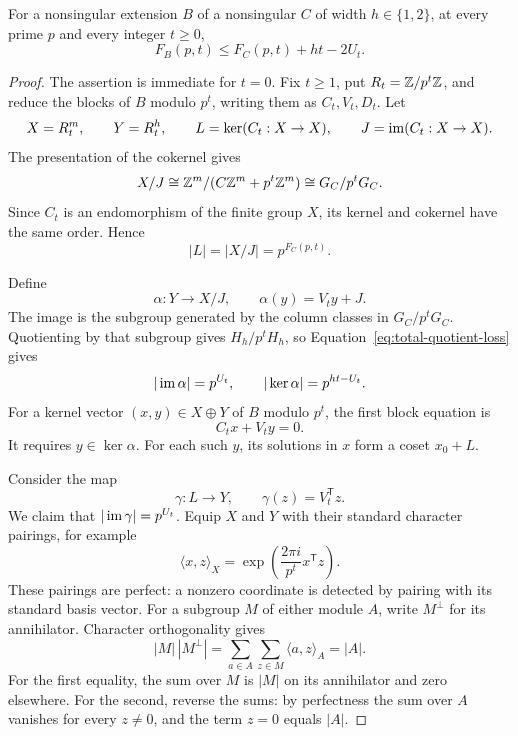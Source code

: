 \begin{lemma}\label{lem:layer-inequality}
For a nonsingular extension \(B\) of a nonsingular \(C\) of width
\(h\in\{1,2\}\), at every prime \(p\) and every integer \(t\ge0\),
\begin{equation}\label{eq:layer-inequality}
 F_B(p,t)\le F_C(p,t)+ht-2U_t.
\end{equation}
\end{lemma}

\begin{proof}
The assertion is immediate for \(t=0\). Fix \(t\ge1\), put
\(R_t=\mathbb Z/p^t\mathbb Z\), and reduce the blocks of \(B\) modulo \(p^t\),
writing them as \(C_t,V_t,D_t\). Let
\[
 X=R_t^m,\qquad Y=R_t^h,\qquad
 L=\ker(C_t:X\to X),\qquad J=\operatorname{im}(C_t:X\to X).
\]
The presentation of the cokernel gives
\[
 X/J\cong \mathbb Z^m/(C\mathbb Z^m+p^t\mathbb Z^m)\cong G_C/p^tG_C.
\]
Since \(C_t\) is an endomorphism of the finite group \(X\), its
kernel and cokernel have the same order. Hence
\begin{equation}\label{eq:kernel-prefix-order}
 |L|=|X/J|=p^{F_C(p,t)}.
\end{equation}

Define
\[
 \alpha:Y\longrightarrow X/J,\qquad \alpha(y)=V_ty+J.
\]
The image is the subgroup generated by the column classes in
\(G_C/p^tG_C\). Quotienting by that subgroup gives
\(H_h/p^tH_h\), so Equation~\eqref{eq:total-quotient-loss} gives
\[
 |\operatorname{im}\alpha|=p^{U_t},\qquad |\ker\alpha|=p^{ht-U_t}.
\]
For a kernel vector \((x,y)\in X\oplus Y\) of \(B\) modulo \(p^t\),
the first block equation is
\begin{equation}\label{eq:first-block-kernel}
 C_tx+V_ty=0.
\end{equation}
It requires \(y\in\ker\alpha\). For each such \(y\), its solutions
in \(x\) form a coset \(x_0+L\).

Consider the map
\[
 \gamma:L\longrightarrow Y,\qquad \gamma(z)=V_t^{\mathsf T}z.
\]
We claim that \(|\operatorname{im}\gamma|=p^{U_t}\). Equip \(X\) and \(Y\) with
their standard character pairings, for example
\[
 \langle x,z\rangle_X
   =\exp\!\left(\frac{2\pi i}{p^t}x^{\mathsf T}z\right).
\]
These pairings are perfect: a nonzero coordinate is detected by pairing
with its standard basis vector. For a subgroup \(M\) of either module
\(A\), write \(M^\perp\) for its annihilator. Character orthogonality
gives
\begin{equation}\label{eq:annihilator-order}
 |M|\,|M^\perp|
 =\sum_{a\in A}\sum_{z\in M}\langle a,z\rangle_A
 =|A|.
\end{equation}
For the first equality, the sum over \(M\) is \(|M|\) on its
annihilator and zero elsewhere. For the second, reverse the sums: by
perfectness the sum over \(A\) vanishes for every \(z\ne0\), and the
term \(z=0\) equals \(|A|\).


\end{proof}
